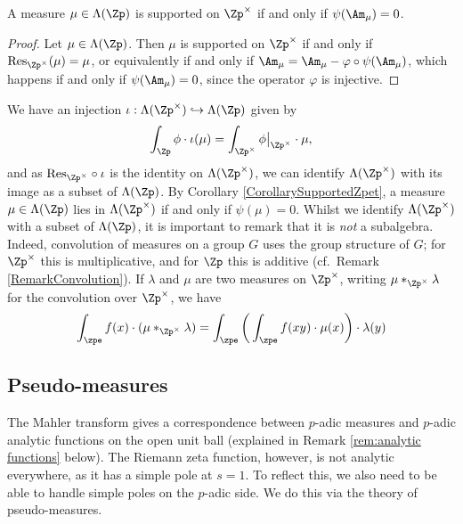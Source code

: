 \documentclass[a4paper,10pt, english, reqno]{smfart}
\numberwithin{equation}{section}
\begin{document}
\begin{corollary} \label{CorollarySupportedZpet}
A measure $\mu \in \Lambda(\Zp)$ is supported on $\Zp^\times$ if and only if $\psi(\Am_\mu) = 0$.
\end{corollary}

\begin{proof}
Let $\mu \in \Lambda(\Zp)$. Then $\mu$ is supported on $\Zp^\times$ if and only if $\mathrm{Res}_{\Zp^\times}(\mu) = \mu$, or equivalently if and only if $\Am_\mu = \Am_\mu - \varphi\circ\psi(\Am_\mu)$, which happens if and only if $\psi(\Am_\mu) = 0$, since the operator $\varphi$ is injective.
\end{proof}

\begin{remark} \label{not subalgebra}
We have an injection $\iota : \Lambda(\Zp^\times) \hookrightarrow \Lambda(\Zp)$ given by
\[\int_{\Zp} \phi \cdot \iota(\mu) = \int_{\Zp^\times} \phi\big|_{\Zp^\times} \cdot \mu,\]
and as $\mathrm{Res}_{\Zp^\times}\circ \iota$ is the identity on $\Lambda(\Zp^\times)$, we can identify $\Lambda(\Zp^\times)$ with its image as a subset of $\Lambda(\Zp)$. By Corollary \ref{CorollarySupportedZpet}, a measure $\mu \in \Lambda(\Zp)$ lies in $\Lambda(\Zp^\times)$ if and only if $\psi(\mu) = 0$. Whilst we identify $\Lambda(\Zp^\times)$ with a subset of $\Lambda(\Zp)$, it is important to remark that it is \emph{not} a subalgebra. Indeed, convolution of measures on a group $G$ uses the group structure of $G$; for $\Zp^\times$ this is multiplicative, and for $\Zp$ this is additive (cf.\ Remark \ref{RemarkConvolution}). If $\lambda$ and $\mu$ are two measures on $\Zp^\times$, writing $\mu *_{\Zp^\times} \lambda$ for the convolution over $\Zp^\times$, we have
\begin{equation}\label{eq:convolution}
\int_{\zpe} f(x) \cdot (\mu*_{\Zp^\times}\lambda) = \int_{\zpe} \bigg( \int_{\zpe} f(x y) \cdot \mu(x) \bigg) \cdot \lambda(y) 
\end{equation}
\end{remark}



\subsection{Pseudo-measures}\label{sec:pseudo-measures}

The Mahler transform gives a correspondence between $p$-adic measures and $p$-adic analytic functions on the open unit ball (explained in Remark \ref{rem:analytic functions} below). The Riemann zeta function, however, is not analytic everywhere, as it has a simple pole at $s=1$. To reflect this, we also need to be able to handle simple poles on the $p$-adic side. We do this via the theory of pseudo-measures.
\end{document}
